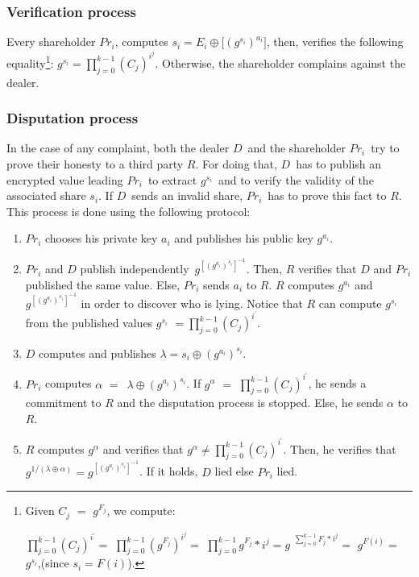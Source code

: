 \documentclass[submission,copyright,creativecommons]{eptcs}
\begin{document}
\subsubsection{Verification process}

Every shareholder $Pr_{i}$, computes $s_{i}=E_{i}\oplus \lbrack
(g^{s_{i}})^{a_{i}}]$, then, verifies the following equality\footnote{Given $C_{j}$ $=$ $g^{F_{j}}$, we compute:
\par
$\prod_{j=0}^{k-1}(C_{j})^{i^{^{_{j}}}}=$ $\prod_{j=0}^{k-1}(g^{F_{j}})^{i^{j}}=$ $\prod_{j=0}^{k-1}g^{F_{j}}\ast {i^{j}}=g$ $^{\sum_{j=0}^{k-1}F_{j}\ast i^{j}}=$ $g^{F(i)}=$ $g^{s_{i}}$,(since $s_{i}=F(i)$).}: $g^{s_{i}}=\prod_{j=0}^{k-1}(C_{j})^{i^{j}}$.
Otherwise, the shareholder complains against the dealer.

\subsubsection{Disputation process}

In the case of any complaint, both the dealer $D$\ and the shareholder $Pr_{i}$\ try to prove their honesty to a third party $R$. For doing that, $D$\ has to publish an encrypted value leading $Pr_{i}$\ to extract $g^{s_{i}}$\ and to verify the validity of the associated share $s_{i}$. If $D$\ sends
an invalid share, $Pr_{i}$\ has to prove this fact to $R$. This process is
done using the following protocol:

\begin{enumerate}
\item $Pr_{i}$ chooses his private key $a_{i}$ and publishes his public key $g^{a_{i}}$.

\item $Pr_{i}$ and $D$ publish independently\ $g^{[(g^{a_{i}})^{s_{i}}]^{-1}}. $ Then, $R$ verifies that $D$ and $Pr_{i}$
published the same value. Else, $Pr_{i}$ sends $a_{i}$ to $R$.  $R$ computes $g^{a_{i}}$ and $g^{[(g^{a_{i}})^{s_{i}}]^{-1}}$ in order to discover who is lying. Notice that $R$ can compute $g^{s_{i}}$ from the
published values $g^{s_{i}}$ $=\prod_{j=0}^{k-1}(C_{j})^{i^{^{_{j}}}}$.\item $D$ computes and publishes $\lambda =s_{i}\oplus (g^{a_{i}})^{s_{i}}$.\ \ \ \ 

\item $Pr_{i}$ computes $\alpha $ $=$\ $\lambda \oplus (g^{a_{i}})^{s_{i}}$.
If $g^{\alpha }$ $=$ $\prod_{j=0}^{k-1}(C_{j})^{i^{^{_{j}}}}$, he sends a
commitment to $R$ and the disputation process is stopped. Else, he sends $\alpha $ to $R$.

\item $R$ computes $g^{\alpha }$ and verifies that $g^{\alpha }\neq
\prod_{j=0}^{k-1}(C_{j})^{i^{^{_{j}}}}$. Then, he verifies that $g^{1/(\lambda \oplus \alpha )}=g^{[(g^{a_{i}})^{s_{i}}]^{-1}}$. If it holds, 
$D$ lied else $Pr_{i}$ lied.
\end{enumerate}
\end{document}
